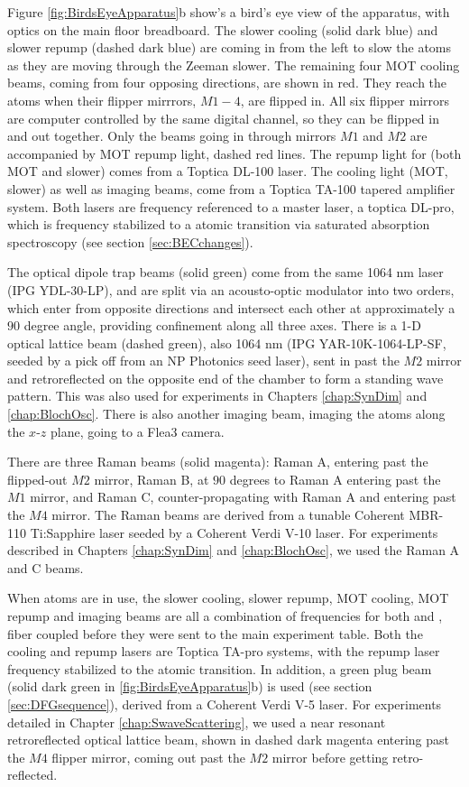 Figure \ref{fig:BirdsEyeApparatus}b show's a bird's eye view of the apparatus, with optics on the main floor breadboard. The slower cooling (solid dark blue) and slower repump (dashed dark blue) are coming in from the left to slow the atoms as they are moving through the Zeeman slower. The remaining four MOT cooling beams, coming from four opposing directions, are shown in red.  They reach the atoms when their flipper mirrrors, $M1-4$, are flipped in. All six flipper mirrors are computer controlled by the same digital channel, so they can be flipped in and out together. Only the beams going in through mirrors $M1$ and $M2$ are accompanied by MOT repump light, dashed red lines. The repump light for \Rb{} (both MOT and slower) comes from a Toptica DL-100 laser. The cooling light (MOT, slower) as well as imaging beams, come from a Toptica TA-100 tapered amplifier system. Both lasers are frequency referenced to a master laser, a toptica DL-pro, which is frequency stabilized to a \Rb{} atomic transition via saturated absorption spectroscopy (see section \ref{sec:BECchanges}).

The optical dipole trap beams (solid green) come from the same 1064 nm laser (IPG YDL-30-LP), and are split via an acousto-optic modulator into two orders, which enter from opposite directions and intersect each other at approximately a $90$ degree angle, providing confinement along all three axes.  There is a 1-D optical lattice beam (dashed green), also 1064 nm (IPG YAR-10K-1064-LP-SF, seeded by a pick off from an NP Photonics seed laser), sent in past the $M2$ mirror and retroreflected on the opposite end of the chamber to form a standing wave pattern. This was also used for experiments in Chapters \ref{chap:SynDim} and \ref{chap:BlochOsc}. There is also another imaging beam, imaging the atoms along the $x$-$z$ plane, going to a Flea3 camera. 

There are three Raman beams (solid magenta): Raman A, entering past the flipped-out $M2$ mirror, Raman B, at $90$ degrees to Raman A entering past the $M1$ mirror, and Raman C, counter-propagating with Raman A and entering past the $M4$ mirror. The Raman beams are derived from a tunable Coherent MBR-110 Ti:Sapphire laser seeded by a Coherent Verdi V-10 laser. For experiments described in Chapters \ref{chap:SynDim} and \ref{chap:BlochOsc}, we used the Raman A and C beams.

When \K{} atoms are in use, the slower cooling, slower repump, MOT cooling, MOT repump and imaging beams are all a combination of frequencies for both \Rb{} and \K{}, fiber coupled before they were sent to the main experiment table. Both the \K{} cooling and repump lasers are Toptica TA-pro systems, with the repump laser frequency stabilized to the \K{} atomic transition. In addition, a green plug beam (solid dark green in \ref{fig:BirdsEyeApparatus}b) is used (see section \ref{sec:DFGsequence}), derived from a Coherent Verdi V-5 laser. For \K{} experiments detailed in Chapter \ref{chap:SwaveScattering}, we used a near resonant retroreflected optical lattice beam, shown in dashed dark magenta entering past the $M4$ flipper mirror, coming out past the $M2$ mirror before getting retro-reflected.

